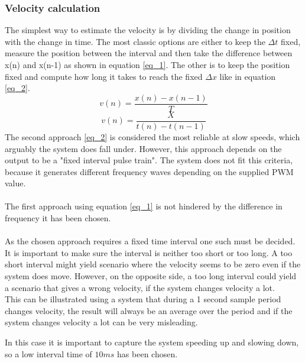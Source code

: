 \documentclass[../../../main]{subfiles}
\begin{document}
\subsubsection{Velocity calculation}
The simplest way to estimate the velocity is by dividing the change in position with the change in time. The most classic options are either to keep the $\Delta t$ fixed, measure the position between the interval and then take the difference between x(n) and x(n-1) as shown in equation \ref{eq_1}. The other is to keep the position fixed and compute how long it takes to reach the fixed  $\Delta x$ like in equation \ref{eq_2}.
\begin{equation}
v(n) = \frac{x(n)-x(n-1)}{T}
\label{eq_1}
\end{equation}
\begin{equation}
  v(n) = \frac{X}{t(n)-t(n-1)}
  \label{eq_2}
\end{equation}
The second approach \ref{eq_2} is considered the most reliable at slow speeds, which arguably the system does fall under. However, this approach depends on the output to be a "fixed interval pulse train"\cite{Velocity_encoder}. The system does not fit this criteria, because it generates different frequency waves depending on the supplied PWM value.\\
\\
The first approach using equation \ref{eq_1} is not hindered by the difference in frequency it has been chosen.  \\
\\
 As the chosen approach requires a fixed time interval one such must be decided. It is important to make sure the interval is neither too short or too long.
 A too short interval might yield scenario where the velocity seems to be zero even if the system does move. However, on the opposite side, a too long interval could yield a scenario that gives a wrong velocity, if the system changes velocity a lot.
\\
This can be illustrated using a system that during a 1 second sample period changes velocity, the result will always be an average over the period and if the system changes velocity a lot can be very misleading.

In this case it is important to capture the system speeding up and slowing down, so a low interval time of $10ms$ has been chosen.
\end{document}
